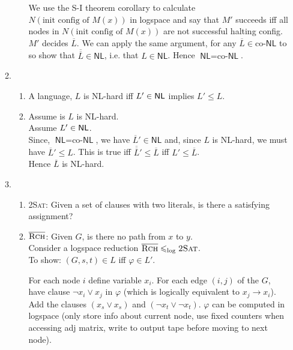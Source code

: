 \documentclass[a4paper, draft, 12pt]{article}
\begin{document}
\begin{enumerate}
\begin{enumerate}
\begin{enumerate}
  We use the S-I theorem corollary to calculate $N(\text{init config of } M(x))$ in logspace and say 
  that $M'$ succeeds iff all nodes in $N(\text{init config of } M(x))$ 
  are not successful halting config. $M'$ decides $\overline{L}$. We can apply the same argument, 
  for any $\overline{L} \in \text{co-}\textsf{NL}$ to so show that 
  $\overline{\overline{L}} \in \textsf{NL}$, i.e. that $L \in \textsf{NL}$. Hence $\textsf{NL} = \text{co-}\textsf{NL}$.
  \end{enumerate}
\item %
  \begin{enumerate}
  \item %
  A language, $L$ is \textsf{NL}-hard iff $L' \in \textsf{NL}$ implies $L' \leqslant L$.
  \item %
  Assume is $L$ is \textsf{NL}-hard. \\
  Assume $L' \in \textsf{NL}$. \\
  Since, $\textsf{NL} = \text{co-}\textsf{NL}$, we have $\overline{L}' \in \textsf{NL}$
  and, since $L$ is NL-hard, we must have $\overline{L}' \leqslant L$. 
  This is true iff  $\overline{\overline{L}}' \leqslant \overline{L}$
  iff $L' \leqslant \overline{L}$. \\
  Hence $\overline{L}$ is \textsf{NL}-hard.
  \end{enumerate}
\item %
  \begin{enumerate}
  \item %
  \textsc{2Sat}: Given a set of clauses with two literals, is there a satisfying assignment?
  \item %
  $\overline{\textsc{Rch}}$: Given $G$, is there no path from $x$ to $y$.\\
  Consider a logspace reduction $\overline{\textsc{Rch}} \leqslant_{\text{log}} \textsc{2Sat}$. \\
  To show: $(G,s,t) \in L$ iff $\varphi \in L'$.

  For each node $i$ define variable $x_i$.
  For each edge $(i, j)$ of the $G$, have clause $\neg  x_i \vee x_j$ in $\varphi$ (which 
  is logically equivalent to $x_j \rightarrow x_i$).\\
  Add the clauses $(x_s \vee x_s)$ and $(\neg x_t \vee \neg x_t)$.
  $\varphi$ can be computed in logspace (only store info about current node, 
  use fixed counters when accessing adj matrix, write to output tape 
  before moving to next node).


\end{enumerate}
\end{enumerate}
\end{enumerate}
\end{document}
